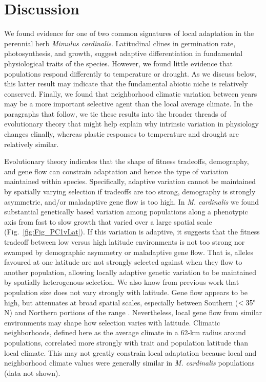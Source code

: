 \documentclass[11pt, oneside]{article}
\begin{document}

\section*{Discussion}

We found evidence for one of two common signatures of local adaptation in the perennial herb \textit{Mimulus cardinalis}. Latitudinal clines in germination rate, photosynthesis, and growth, suggest adaptive differentiation in fundamental physiological traits of the species. However, we found little evidence that populations respond differently to temperature or drought. As we discuss below, this latter result may indicate that the fundamental abiotic niche is relatively conserved. Finally, we found that neighborhood climatic variation between years may be a more important selective agent than the local average climate. In the paragraphs that follow, we tie these results into the broader threads of evolutionary theory that might help explain why intrinsic variation in physiology changes clinally, whereas plastic responses to temperature and drought are relatively similar.

Evolutionary theory indicates that the shape of fitness tradeoffs, demography, and gene flow can constrain adaptation \citep{Levins_1968, Ronce_Kirkpatrick_2001} and hence the type of variation maintained within species. Specifically, adaptive variation cannot be maintained by spatially varying selection if tradeoffs are too strong, demography is strongly asymmetric, and/or maladaptive gene flow is too high. In \textit{M. cardinalis} we found substantial genetically based variation among populations along a phenotypic axis from fast to slow growth that varied over a large spatial scale (Fig.~\ref{fig:Fig_PC1vLat}). If this variation is adaptive, it suggests that the fitness tradeoff between low versus high latitude environments is not too strong nor swamped by demographic asymmetry or maladaptive gene flow. That is, alleles favoured at one latitude are not strongly selected against when they flow to another population, allowing locally adaptive genetic variation to be maintained by spatially heterogenous selection. We also know from previous work that population size does not vary strongly with latitude. Gene flow appears to be high, but attenuates at broad spatial scales, especially between Southern ($<35\degree$N) and Northern portions of the range \citep{Paul_etal_2016}. Nevertheless, local gene flow from similar environments may shape how selection varies with latitude. Climatic neighborhoods, defined here as the average climate in a 62-km radius around populations, correlated more strongly with trait and population latitude than local climate. This may not greatly constrain local adaptation because local and neighborhood climate values were generally similar in \textit{M. cardinalis} populations (data not shown).
\end{document}

